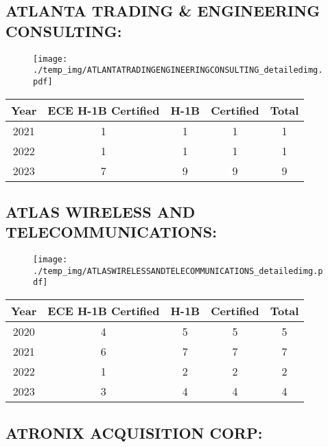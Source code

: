 \documentclass{article}%
\begin{document}
%
\newpage%
\subsection{ATLANTA TRADING \& ENGINEERING CONSULTING:}%
\label{subsec:ATLANTATRADINGENGINEERINGCONSULTING}%
\label{ATLANTATRADINGENGINEERINGCONSULTINGdetailed}%


\begin{figure}[htbp]%
\centering%
\texttt{[image: ./temp\_img/ATLANTATRADINGENGINEERINGCONSULTING\_detailedimg.pdf]}%
\end{figure}

%
\begin{longtable}{c|c|c|c|c}%
\hline%
Year&ECE H{-}1B Certified&H{-}1B&Certified&Total\\%
\hline%
2021&1&1&1&1\\%
\hline%
2022&1&1&1&1\\%
\hline%
2023&7&9&9&9\\%
\hline%
\end{longtable}

%
\newpage%
\subsection{ATLAS WIRELESS AND TELECOMMUNICATIONS:}%
\label{subsec:ATLASWIRELESSANDTELECOMMUNICATIONS}%
\label{ATLASWIRELESSANDTELECOMMUNICATIONSdetailed}%


\begin{figure}[htbp]%
\centering%
\texttt{[image: ./temp\_img/ATLASWIRELESSANDTELECOMMUNICATIONS\_detailedimg.pdf]}%
\end{figure}

%
\begin{longtable}{c|c|c|c|c}%
\hline%
Year&ECE H{-}1B Certified&H{-}1B&Certified&Total\\%
\hline%
2020&4&5&5&5\\%
\hline%
2021&6&7&7&7\\%
\hline%
2022&1&2&2&2\\%
\hline%
2023&3&4&4&4\\%
\hline%
\end{longtable}

%
\newpage%
\subsection{ATRONIX ACQUISITION CORP:}%
\label{subsec:ATRONIXACQUISITIONCORP}%
\label{ATRONIXACQUISITIONCORPdetailed}%
\end{document}
